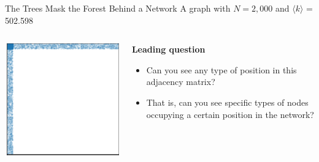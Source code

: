 \documentclass[show notes, aspectratio=1610]{beamer}
\begin{document}
\begin{frame}{The Trees Mask the Forest Behind a Network}
	{A graph with $N = 2,000$ and $\langle k \rangle$ = 502.598 }
	\begin{columns}
		\begin{column}{0.5\textwidth}
			\centering 
			\includegraphics[]{../images/blockmodel.pdf}

		\end{column}
		\begin{column}{0.3\textwidth}
			\textbf{Leading question}

			\begin{itemize}
				\item 
				Can you see any type of position in this 
				adjacency matrix?
				\item That is, can you see specific types of nodes 
				occupying a certain position in the network?
			\end{itemize}
		\end{column}
	\end{columns}
\end{frame}
\end{document}
